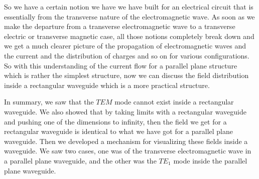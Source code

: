 So we have a certain notion we have we have built for an electrical circuit that is essentially from the transverse nature of the electromagnetic wave. As soon as we make the departure from a transverse electromagnetic wave to a transverse electric or transverse magnetic case, all those notions completely break down and we get a much clearer picture of the propagation of electromagnetic waves and the current and the distribution of charges and so on for various configurations. So with this understanding of the current flow for a parallel plane structure which is rather the simplest structure, now we can discuss the field distribution inside a rectangular waveguide which is a more practical structure.

In summary, we saw that the $TEM$ mode cannot exist inside a rectangular waveguide. We also showed that by taking limits with a rectangular waveguide and pushing one of the dimensions to infinity, then the field we get for a rectangular waveguide is identical to what we have got for a parallel plane waveguide. Then we developed a mechanism for visualizing these fields inside a waveguide. We saw two cases, one was of the transverse electromagnetic wave in a parallel plane waveguide, and the other was the ${TE_1}$ mode inside the parallel plane waveguide. 

